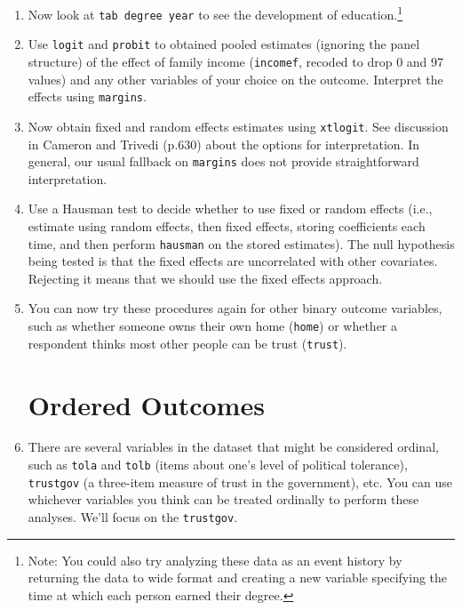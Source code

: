 \documentclass[a4paper,12pt]{article}
\begin{document}
\begin{enumerate}
\item Now look at \texttt{tab degree year} to see the development of education.\footnote{Note: You could also try analyzing these data as an event history by returning the data to wide format and creating a new variable specifying the time at which each person earned their degree.}

\item Use \texttt{logit} and \texttt{probit} to obtained pooled estimates (ignoring the panel structure) of the effect of family income (\texttt{incomef}, recoded to drop 0 and 97 values) and any other variables of your choice on the outcome. Interpret the effects using \texttt{margins}.

\item Now obtain fixed and random effects estimates using \texttt{xtlogit}. See discussion in Cameron and Trivedi (p.630) about the options for interpretation. In general, our usual fallback on \texttt{margins} does not provide straightforward interpretation.

\item Use a Hausman test to decide whether to use fixed or random effects (i.e., estimate using random effects, then fixed effects, storing coefficients each time, and then perform \texttt{hausman} on the stored estimates). The null hypothesis being tested is that the fixed effects are uncorrelated with other covariates. Rejecting it means that we should use the fixed effects approach.







\item You can now try these procedures again for other binary outcome variables, such as whether someone owns their own home (\texttt{home}) or whether a respondent thinks most other people can be trust (\texttt{trust}).

\section{Ordered Outcomes}

\item There are several variables in the dataset that might be considered ordinal, such as \texttt{tola} and \texttt{tolb} (items about one's level of political tolerance), \texttt{trustgov} (a three-item measure of trust in the government), etc. You can use whichever variables you think can be treated ordinally to perform these analyses. We'll focus on the \texttt{trustgov}.


\end{enumerate}
\end{document}
